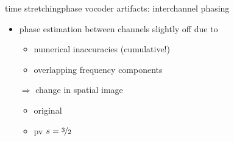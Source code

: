 	\begin{frame}{time stretching}{phase vocoder artifacts: interchannel phasing}
        \begin{itemize}
            \item   phase estimation between channels slightly off due to
                \begin{itemize}
                    \item   numerical inaccuracies (cumulative!)
                    \item   overlapping frequency components
                \end{itemize}
                \pause
                \bigskip
            \item[$\Rightarrow$] change in spatial image
                \begin{itemize}
                            \item   original  
                            \item   pv $s = \nicefrac{3}{2}$ 
                \end{itemize}
        \end{itemize}
	\end{frame}

